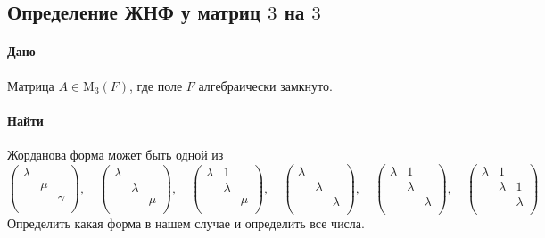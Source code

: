 \documentclass{article}
\newcommand{\Matrix}[2]{\operatorname{\mathrm{M}_{#2}}(#1)}
\begin{document}
\subsection{Определение ЖНФ у матриц $3$ на $3$}

\paragraph{Дано}

Матрица $A\in \Matrix{F}{3}$, где поле $F$ алгебраически замкнуто.

\paragraph{Найти}

Жорданова форма может быть одной из
\[
\begin{pmatrix}
{\lambda}&{}&{}\\
{}&{\mu}&{}\\
{}&{}&{\gamma}\\
\end{pmatrix}
,\quad
\begin{pmatrix}
{\lambda}&{}&{}\\
{}&{\lambda}&{}\\
{}&{}&{\mu}\\
\end{pmatrix}
,\quad
\begin{pmatrix}
{\lambda}&{1}&{}\\
{}&{\lambda}&{}\\
{}&{}&{\mu}\\
\end{pmatrix}
,\quad
\begin{pmatrix}
{\lambda}&{}&{}\\
{}&{\lambda}&{}\\
{}&{}&{\lambda}\\
\end{pmatrix}
,\quad
\begin{pmatrix}
{\lambda}&{1}&{}\\
{}&{\lambda}&{}\\
{}&{}&{\lambda}\\
\end{pmatrix}
,\quad
\begin{pmatrix}
{\lambda}&{1}&{}\\
{}&{\lambda}&{1}\\
{}&{}&{\lambda}\\
\end{pmatrix}
\]
Определить какая форма в нашем случае и определить все числа.
\end{document}
